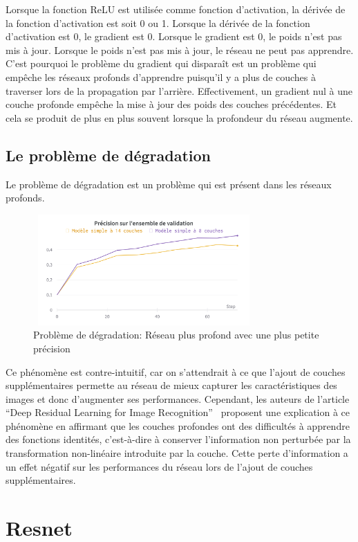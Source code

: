 \documentclass{article}
\begin{document}
Lorsque la fonction ReLU est utilisée comme fonction d'activation, la dérivée de la fonction d'activation est soit 0 ou 1.
Lorsque la dérivée de la fonction d'activation est 0, le gradient est 0.
Lorsque le gradient est 0, le poids n'est pas mis à jour.
Lorsque le poids n'est pas mis à jour, le réseau ne peut pas apprendre.
C'est pourquoi le problème du gradient qui disparaît est un problème qui empêche les réseaux profonds d'apprendre puisqu'il y a plus
de couches à traverser lors de la propagation par l'arrière. Effectivement, un gradient nul à une couche profonde empêche
la mise à jour des poids des couches précédentes. Et cela se produit de plus en plus souvent lorsque la profondeur du réseau augmente.

\subsection{Le problème de dégradation}
Le problème de dégradation est un problème qui est présent dans les réseaux profonds.

\begin{figure}[h]
    \centering
    \includegraphics[width=240pt,height=120pt]{./img/degradation}
    \caption{Problème de dégradation: Réseau plus profond avec une plus petite précision}\label{fig: degrad}
\end{figure}

Ce phénomène est contre-intuitif, car on s'attendrait à ce que l'ajout de couches supplémentaires permette au réseau de mieux
capturer les caractéristiques des images et donc d'augmenter ses performances.
Cependant, les auteurs de l'article ``Deep Residual Learning for Image Recognition''~\cite{resnet}
proposent une explication à ce phénomène
en affirmant que les couches profondes ont des difficultés à apprendre des fonctions identités,
c'est-à-dire à conserver l'information non perturbée par la transformation non-linéaire introduite par la couche.
Cette perte d'information a un effet négatif sur les performances du réseau lors de l'ajout de couches supplémentaires.

\section{Resnet}
\end{document}
